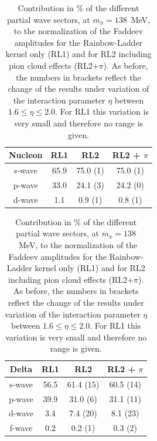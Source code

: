\begin{table}[t]
 \begin{center}
 \small
\renewcommand{\arraystretch}{1.2}
  \begin{tabular}[h]{|c||c|c|c|}\hline
Nucleon &  RL1  &  RL2	        &	RL2 + $\pi$   \\ \hline\hline
 s-wave & 65.9  &  75.0 (1)		&	75.0 (1)     \\ \hline
 p-wave & 33.0  &  24.1 (3)		&	24.2 (0)     \\ \hline
 d-wave &  1.1  &   0.9 (1)		&	 0.8 (1)  \\ \hline
\end{tabular}\hspace{1cm}
  \begin{tabular}[h]{|c||c|c|c|}\hline
  Delta &  RL1 &  RL2	&	RL2 + $\pi$ \\ \hline\hline
 s-wave & 56.5 &  61.4 (15)	&	60.5 (14) \\ \hline
 p-wave & 39.9 &  31.0 (6)	&	31.1 (11) \\ \hline
 d-wave & 3.4  &  7.4 (20)	&	 8.1 (23) \\ \hline
 f-wave & 0.2  &  0.2 (1)	&	 0.3 (2) \\ \hline
\end{tabular}
\caption{Contribution in \% of the different partial wave sectors, at $m_{\pi}=138$~MeV, 
to the normalization of the Faddeev amplitudes for the Rainbow-Ladder kernel only (RL1) 
and for RL2 including pion cloud effects (RL2+$\pi$). As before, the numbers in brackets 
reflect the change of the results under variation of the interaction parameter $\eta$ 
between $1.6 \le \eta \le 2.0$. For RL1 this variation is very small and therefore no 
range is given. \label{tab:PartialWaveContributions}}
 \end{center}
\end{table}

